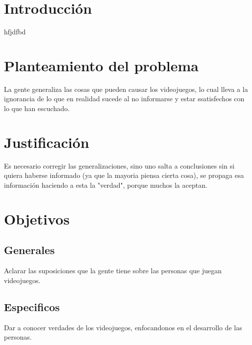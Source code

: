 \documentclass{bmcart}
\begin{document}


\section*{Introducción}
hfjdfbd

\section*{Planteamiento del problema}
La gente generaliza las cosas que pueden causar los videojuegos, lo cual lleva a la ignorancia de lo que en realidad sucede al no informarse y estar ssatisfechos con lo que han escuchado.
\section*{Justificación}
Es necesario corregir las generalizaciones, sino uno salta a conclusiones sin si quiera haberse informado (ya que la mayoria piensa cierta cosa), se propaga esa información haciendo a esta la "verdad", porque muchos la aceptan.
\section*{Objetivos}
\subsection*{Generales}
Aclarar las suposiciones que la gente tiene sobre las personas que juegan videojuegos.
\subsection*{Especificos}
Dar a conocer verdades de los videojuegos, enfocandonos en el desarrollo de las personas.
\end{document}
